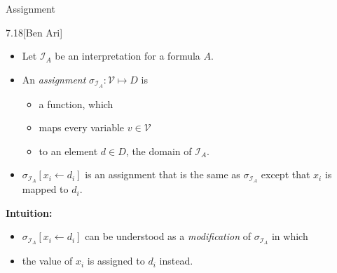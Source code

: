 \begin{wideslide}[bm=,toc=]{Assignment}
\begin{defn}{7.18}[Ben Ari]~\\
\begin{itemize}
\item<2-> Let $\mathcal{I}_A$ be an interpretation for a formula $A$. 
\item<3-> An \emph{assignment} $\sigma_{\mathcal{I}_A}: \mathcal{V} \mapsto D$ is 
\begin{itemize}
\item<4-> a function, which 
\item<5-> maps every variable $v \in \mathcal{V}$ 
\item<6-> to an element $d \in D$, the domain of $\mathcal{I}_A$.
\end{itemize}
\item<7-> $\sigma_{\mathcal{I}_A}[x_i \leftarrow d_i]$ is an assignment that is
the same as $\sigma_{\mathcal{I}_A}$ except that $x_i$ is mapped to
$d_i$.
\end{itemize}
\end{defn}
\pause[7]
\textbf{Intuition:}
\begin{itemize}
\item $\sigma_{\mathcal{I}_A}[x_i \leftarrow d_i]$ can be
understood as a \emph{modification} of $\sigma_{\mathcal{I}_A}$ in which 
\item the value of $x_i$ is assigned to $d_i$ instead.
\end{itemize}
\end{wideslide}


